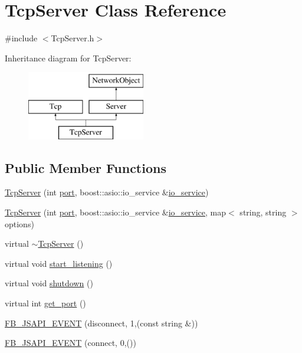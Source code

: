 \hypertarget{classTcpServer}{
\section{TcpServer Class Reference}
\label{classTcpServer}
}


{\ttfamily \#include $<$TcpServer.h$>$}

Inheritance diagram for TcpServer:\begin{figure}[H]
\begin{center}
\leavevmode
\includegraphics[height=3.000000cm]{classTcpServer}
\end{center}
\end{figure}
\subsection*{Public Member Functions}
\begin{DoxyCompactItemize}
\item 
\hyperlink{classTcpServer_a6c573fc4b33ec7c841afb400a061a08f}{TcpServer} (int \hyperlink{classTcp_a7ed15f78afc9d0675404b4b41cc723ba}{port}, boost::asio::io\_\-service \&\hyperlink{classTcp_ad0c319a0974aa3f07e9c5ae290ea18b4}{io\_\-service})
\item 
\hyperlink{classTcpServer_a7b8c4471aba48774b338b5bc5c4cb310}{TcpServer} (int \hyperlink{classTcp_a7ed15f78afc9d0675404b4b41cc723ba}{port}, boost::asio::io\_\-service \&\hyperlink{classTcp_ad0c319a0974aa3f07e9c5ae290ea18b4}{io\_\-service}, map$<$ string, string $>$ options)
\item 
virtual \hyperlink{classTcpServer_a728a9e31c53cf86887f1f6149b1c46dd}{$\sim$TcpServer} ()
\item 
virtual void \hyperlink{classTcpServer_ad16f797335dd9c54eaec93c35d158569}{start\_\-listening} ()
\item 
virtual void \hyperlink{classTcpServer_a918898ee7b13d776a2f7ea8968168669}{shutdown} ()
\item 
virtual int \hyperlink{classTcpServer_a65be01f9466447530de3112d538267b4}{get\_\-port} ()
\item 
\hyperlink{classTcpServer_afb381d332f0169ac7b1dc3d97de93239}{FB\_\-JSAPI\_\-EVENT} (disconnect, 1,(const string \&))
\item 
\hyperlink{classTcpServer_a0ef55e7e09a51df56c4d1a76e4bda573}{FB\_\-JSAPI\_\-EVENT} (connect, 0,())
\end{DoxyCompactItemize}
